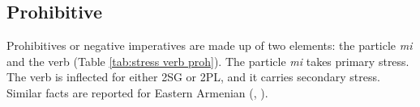 \begin{table}[H]
	\centering
	\caption{Stress in negative periphrastic forms in Western vs. Eastern for the verb `to measure' }
	\label{tab:periphrastic stress neg east west}
	\end{table}



\subsection{Prohibitive}\label{section:stress:verb:proh}

Prohibitives or negative imperatives are made up of two elements: the particle \textit{mi} and the verb (Table \ref{tab:stress verb proh}).  The particle \textit{mi} takes primary stress. The verb is inflected for either 2SG or 2PL, and it carries secondary stress. Similar facts are reported for Eastern Armenian (\citealt[20]{Abeghyan-1933-Meter}, \citealt[77]{Margaryan-1997-ArmenianPhonology}). 

